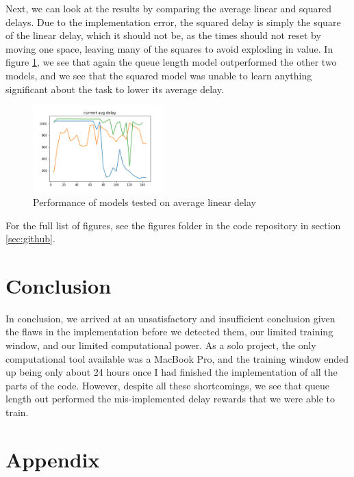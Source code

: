 \documentclass[12pt,twocolumn]{article}
\begin{document}
Next, we can look at the results by comparing the average linear and squared delays. Due to the implementation error, the squared delay is simply the square of the linear delay, which it should not be, as the times should not reset by moving one space, leaving many of the squares to avoid exploding in value. In figure \ref{fig:current_avg_del}, we see that again the queue length model outperformed the other two models, and we see that the squared model was unable to learn anything significant about the task to lower its average delay.

\begin{figure}
    \begin{center}
    \includegraphics[width=0.45\textwidth]{Figures/current_avg_delay}
    \caption{Performance of models tested on average linear delay}
    \label{fig:current_avg_del}
    \end{center}
\end{figure}

For the full list of figures, see the figures folder in the code repository in section \ref{sec:github}.

\section{Conclusion}

In conclusion, we arrived at an unsatisfactory and insufficient conclusion given the flaws in the implementation before we detected them, our limited training window, and our limited computational power. As a solo project, the only computational tool available was a MacBook Pro, and the training window ended up being only about 24 hours once I had finished the implementation of all the parts of the code. However, despite all these shortcomings, we see that queue length out performed the mis-implemented delay rewards that we were able to train. 

\section{Appendix}
\end{document}
